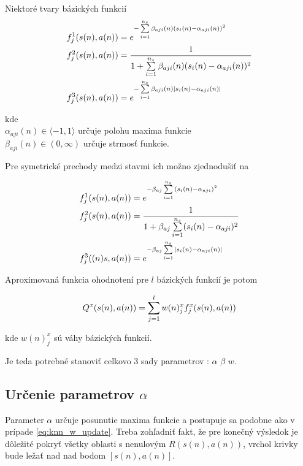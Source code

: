 Niektoré tvary bázických funkcií
\begin{align}
    f_j^1(\boldmath{s(n), a(n)}) &= e^{ -\sum\limits_{i=1}^{n_s}{\beta_{aji}(n)(s_i(n) - \alpha_{aji}(n))^2} }  \\
    f_j^2(\boldmath{s(n), a(n)}) &= \frac{1}{1 + \sum\limits_{i=1}^{n_s}{\beta_{aji}(n)(s_i(n) - \alpha_{aji}(n))^2}}  \\
    f_j^3(\boldmath{s(n), a(n)}) &= e^{ -\sum\limits_{i=1}^{n_s}{\beta_{aji}(n)\mid s_i(n) - \alpha_{aji}(n) \mid} }
\end{align}

kde \\
$\alpha_{aji}(n) \in \langle -1, 1 \rangle$ určuje polohu maxima funkcie \\
$\beta_{aji}(n) \in (0, \infty)$ určuje strmosť funkcie.

Pre symetrické prechody medzi stavmi ich možno zjednodušiť na

\begin{align}
f_j^1(\boldmath{s(n), a(n)}) &= e^{ -\beta_{aj} \sum\limits_{i=1}^{n_s}{(s_i(n) - \alpha_{aji})^2} }  \\
f_j^2(\boldmath{s(n), a(n)}) &= \frac{1}{1 + {\beta_{aj} \sum\limits_{i=1}^{n_s}(s_i(n) - \alpha_{aji})^2}}  \\
f_j^3(\boldmath{(n)s, a(n)}) &= e^{ -\beta_{aj} \sum\limits_{i=1}^{n_s}{\mid s_i(n) - \alpha_{aji}(n) \mid} }
\label{eq:basis_functions}
\end{align}

Aproximovaná funkcia ohodnotení pre $l$ bázických funkcií je potom

\begin{align}
Q^x(s(n), a(n)) = \sum\limits_{j=1}^{l} w(n)_j^x f_j^x(\boldmath{s(n), a(n)})
\label{eq:knn_y_update}
\end{align}

kde $w(n)_j^x$ sú váhy bázických funkcií.


Je teda potrebné stanoviť celkovo 3 sady parametrov : $\alpha$ $\beta$ $w$.

\subsection{Určenie parametrov $\alpha$}

Parameter $\alpha$ určuje posunutie maxima funkcie a postupuje sa podobne
ako v prípade \ref{eq:knn_w_update}. Treba zohľadniť fakt, že pre konečný
výsledok je dôležité pokryť všetky oblasti s nenulovým $R(s(n),a(n))$, vrchol
krivky bude ležať nad nad bodom $[s(n),a(n)]$.


